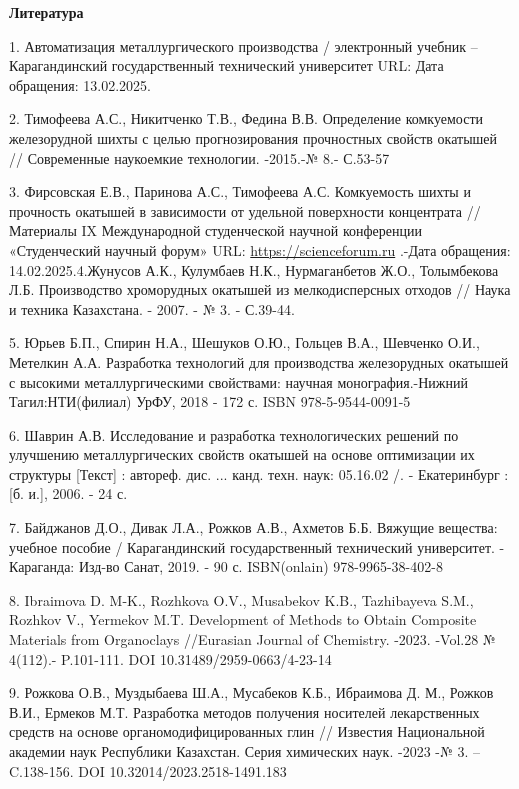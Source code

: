 \begin{center}
{\bfseries Литература}
\end{center}

\begin{references}
1. Автоматизация металлургического производства / электронный учебник --
Карагандинский государственный технический университет URL:
\href{https://www.kstu.kz/wp-content/uploads/2018/05/tsifrovaya-mitallurgiya/el-uch-po-ampr/index.htm-}{}
Дата обращения: 13.02.2025.

2. Тимофеева А.С., Никитченко Т.В., Федина В.В. Определение комкуемости
железорудной шихты с целью прогнозирования прочностных свойств окатышей
// Современные наукоемкие технологии. -2015.-№ 8.- С.53-57

3. Фирсовская Е.В., Паринова А.С., Тимофеева А.С. Комкуемость шихты и
прочность окатышей в зависимости от удельной поверхности концентрата
//Материалы IX Международной студенческой научной конференции
«Студенческий научный форум» URL:
\href{https://scienceforum.ru/2017/article/2017038139}{https://scienceforum.ru} .-Дата обращения:
14.02.2025.4.Жунусов А.К., Кулумбаев Н.К., Нурмаганбетов Ж.О., Толымбекова Л.Б.
Производство хроморудных окатышей из мелкодисперсных отходов // Наука и
техника Казахстана. - 2007. - № 3. - С.39-44.

5. Юрьев Б.П., Спирин Н.А., Шешуков О.Ю., Гольцев В.А., Шевченко О.И.,
Метелкин А.А. Разработка технологий для производства железорудных
окатышей с высокими металлургическими свойствами: научная
монография.-Нижний Тагил:НТИ(филиал) УрФУ, 2018 - 172 с. ISBN
978-5-9544-0091-5

6. Шаврин А.В. Исследование и разработка технологических решений по
улучшению металлургических свойств окатышей на основе оптимизации их
структуры {[}Текст{]} : автореф. дис. ... канд. техн. наук: 05.16.02 /.
- Екатеринбург : {[}б. и.{]}, 2006. - 24 с.

7. Байджанов Д.О., Дивак Л.А., Рожков А.В., Ахметов Б.Б. Вяжущие
вещества: учебное пособие / Карагандинский государственный технический
университет. - Караганда: Изд-во Санат, 2019. - 90 с. ISBN(onlain)
978-9965-38-402-8

8. Ibraimova D. M-K., Rozhkova O.V., Musabekov K.B., Tazhibayeva S.M.,
Rozhkov V., Yermekov M.T. Development of Methods to Obtain Composite
Materials from Organoclays //Eurasian Journal of Chemistry. -2023.
-Vol.28 № 4(112).- P.101-111. DOI 10.31489/2959-0663/4-23-14

9. Рожкова О.В., Муздыбаева Ш.А., Мусабеков К.Б., Ибраимова Д. М., Рожков
В.И., Ермеков М.Т. Разработка методов получения носителей лекарственных
средств на основе органомодифицированных глин // Известия Национальной
академии наук Республики Казахстан. Серия химических наук. -2023 -№ 3.
-- C.138-156. DOI 10.32014/2023.2518-1491.183


\end{references}

